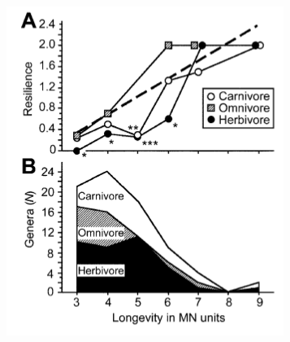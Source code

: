 \documentclass{beamer}
\begin{document}
\begin{frame}
\begin{columns}
\begin{column}{0.5\textwidth}
      \tiny{}
    \end{column}
    \begin{column}{0.5\textwidth}
      \includegraphics[height=0.5\textheight,width=\textwidth,keepaspectratio=true]{figure/jernvall}
      
      \tiny{}
    \end{column}
  \end{columns}
\end{frame}
\end{document}
